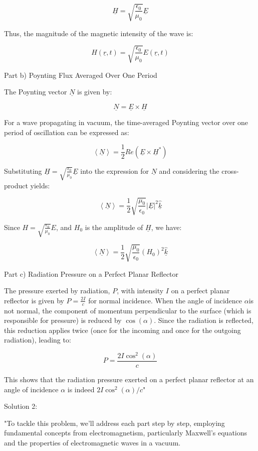 \[
\underline{H} = \sqrt{\frac{\epsilon_{0}}{\mu_{0}}} \underline{E}
\]

Thus, the magnitude of the magnetic intensity of the wave is:

\[
H(\underline{r}, t) = \sqrt{\frac{\epsilon_{0}}{\mu_{0}}} E(\underline{r}, t)
\]

Part b) Poynting Flux Averaged Over One Period

The Poynting vector \(\underline{N}\) is given by:

\[
\underline{N} = \underline{E} \times \underline{H}
\]

For a wave propagating in vacuum, the time-averaged Poynting vector over one period of oscillation can be expressed as:

\[
\left< \underline{N} \right> = \frac{1}{2} Re(\underline{E} \times \underline{H}^{*})
\]

Substituting \(\underline{H} = \sqrt{\frac{\epsilon_{0}}{\mu_{0}}} \underline{E}\) into the expression for \(\underline{N}\) and considering the cross-product yields:

\[
\left< \underline{N} \right> = \frac{1}{2} \sqrt{\frac{\mu_{0}}{\epsilon_{0}}} \left| \underline{E} \right|^2 \hat{\underline{k}}
\]

Since \(H = \sqrt{\frac{\epsilon_{0}}{\mu_{0}}} E\), and \(H_{0}\) is the amplitude of \(\underline{H}\), we have:

\[
\left< \underline{N} \right> = \frac{1}{2} \sqrt{\frac{\mu_{0}}{\epsilon_{0}}} (H_{0})^{2} \hat{\underline{k}}
\]

Part c) Radiation Pressure on a Perfect Planar Reflector

The pressure exerted by radiation, \( P\), with intensity \(I\) on a perfect planar reflector is given by \(P=\frac{2I}{c}\) for normal incidence. When the angle of incidence \(\alpha\)is not normal, the component of momentum perpendicular to the surface (which is responsible for pressure) is reduced by \(\cos(\alpha)\). Since the radiation is reflected, this reduction applies twice (once for the incoming and once for the outgoing radiation), leading to:

\[P = \frac{2I \cos^{2}(\alpha)}{c}\]

This shows that the radiation pressure exerted on a perfect planar reflector at an angle of incidence \(\alpha\) is indeed \(2I\cos^{2}(\alpha) / c\)"

Solution 2: 

"To tackle this problem, we'll address each part step by step, employing fundamental concepts from electromagnetism, particularly Maxwell's equations and the properties of electromagnetic waves in a vacuum.

